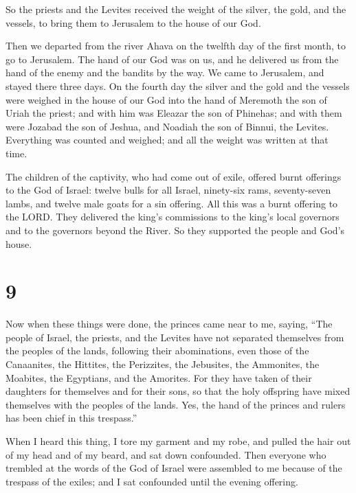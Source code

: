  So the priests and the Levites received the weight of the
silver, the gold, and the vessels, to bring them to Jerusalem to the
house of our God.

 Then we departed from the river Ahava on the twelfth day
of the first month, to go to Jerusalem. The hand of our God was on us,
and he delivered us from the hand of the enemy and the bandits by the
way.  We came to Jerusalem, and stayed there three days.
 On the fourth day the silver and the gold and the vessels
were weighed in the house of our God into the hand of Meremoth the son
of Uriah the priest; and with him was Eleazar the son of Phinehas; and
with them were Jozabad the son of Jeshua, and Noadiah the son of Binnui,
the Levites.  Everything was counted and weighed; and all
the weight was written at that time.

 The children of the captivity, who had come out of exile,
offered burnt offerings to the God of Israel: twelve bulls for all
Israel, ninety-six rams, seventy-seven lambs, and twelve male goats for
a sin offering. All this was a burnt offering to the LORD. 
They delivered the king's commissions to the king's local governors and
to the governors beyond the River. So they supported the people and
God's house.

\hypertarget{section-8}{%
\section{9}\label{section-8}}

 Now when these things were done, the princes came near to
me, saying, ``The people of Israel, the priests, and the Levites have
not separated themselves from the peoples of the lands, following their
abominations, even those of the Canaanites, the Hittites, the
Perizzites, the Jebusites, the Ammonites, the Moabites, the Egyptians,
and the Amorites.  For they have taken of their daughters
for themselves and for their sons, so that the holy offspring have mixed
themselves with the peoples of the lands. Yes, the hand of the princes
and rulers has been chief in this trespass.''

 When I heard this thing, I tore my garment and my robe, and
pulled the hair out of my head and of my beard, and sat down confounded.
 Then everyone who trembled at the words of the God of
Israel were assembled to me because of the trespass of the exiles; and I
sat confounded until the evening offering.


